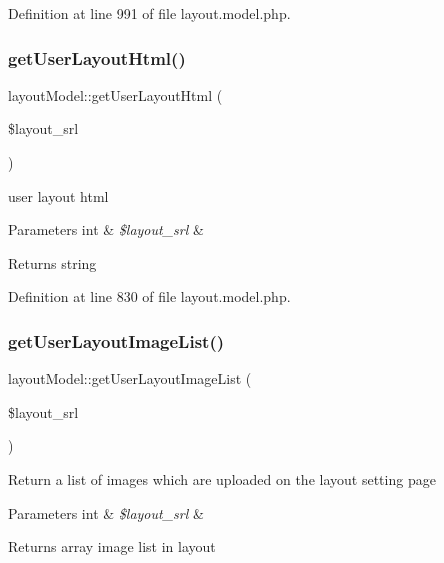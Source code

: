 Definition at line 991 of file layout.\+model.\+php.

\hypertarget{classlayoutModel_ae1d2250f4bb3703f82998937c46a0a57}{}\label{classlayoutModel_ae1d2250f4bb3703f82998937c46a0a57} 
\subsubsection{\texorpdfstring{get\+User\+Layout\+Html()}{getUserLayoutHtml()}}
{\footnotesize\ttfamily layout\+Model\+::get\+User\+Layout\+Html (\begin{DoxyParamCaption}\item[{}]{\$layout\+\_\+srl }\end{DoxyParamCaption})}

user layout html 
\begin{DoxyParams}[1]{Parameters}
int & {\em \$layout\+\_\+srl} & \\
\hline
\end{DoxyParams}
\begin{DoxyReturn}{Returns}
string 
\end{DoxyReturn}


Definition at line 830 of file layout.\+model.\+php.

\hypertarget{classlayoutModel_a6bb9dc3b7dc427d7916bf2a743b8e412}{}\label{classlayoutModel_a6bb9dc3b7dc427d7916bf2a743b8e412} 
\subsubsection{\texorpdfstring{get\+User\+Layout\+Image\+List()}{getUserLayoutImageList()}}
{\footnotesize\ttfamily layout\+Model\+::get\+User\+Layout\+Image\+List (\begin{DoxyParamCaption}\item[{}]{\$layout\+\_\+srl }\end{DoxyParamCaption})}

Return a list of images which are uploaded on the layout setting page 
\begin{DoxyParams}[1]{Parameters}
int & {\em \$layout\+\_\+srl} & \\
\hline
\end{DoxyParams}
\begin{DoxyReturn}{Returns}
array image list in layout 
\end{DoxyReturn}


